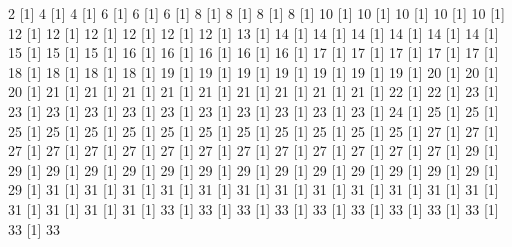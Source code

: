 \documentclass[12pt]{article}
\begin{document}
\begin{Schunk}
\begin{Soutput}
[1] 2%
[1] 4%
[1] 4%
[1] 6%
[1] 6%
[1] 6%
[1] 8%
[1] 8%
[1] 8%
[1] 8%
[1] 10%
[1] 10%
[1] 10%
[1] 10%
[1] 10%
[1] 12%
[1] 12%
[1] 12%
[1] 12%
[1] 12%
[1] 12%
[1] 13%
[1] 14%
[1] 14%
[1] 14%
[1] 14%
[1] 14%
[1] 14%
[1] 15%
[1] 15%
[1] 15%
[1] 16%
[1] 16%
[1] 16%
[1] 16%
[1] 16%
[1] 17%
[1] 17%
[1] 17%
[1] 17%
[1] 17%
[1] 18%
[1] 18%
[1] 18%
[1] 18%
[1] 19%
[1] 19%
[1] 19%
[1] 19%
[1] 19%
[1] 19%
[1] 19%
[1] 20%
[1] 20%
[1] 20%
[1] 21%
[1] 21%
[1] 21%
[1] 21%
[1] 21%
[1] 21%
[1] 21%
[1] 21%
[1] 21%
[1] 22%
[1] 22%
[1] 23%
[1] 23%
[1] 23%
[1] 23%
[1] 23%
[1] 23%
[1] 23%
[1] 23%
[1] 23%
[1] 23%
[1] 23%
[1] 24%
[1] 25%
[1] 25%
[1] 25%
[1] 25%
[1] 25%
[1] 25%
[1] 25%
[1] 25%
[1] 25%
[1] 25%
[1] 25%
[1] 25%
[1] 25%
[1] 27%
[1] 27%
[1] 27%
[1] 27%
[1] 27%
[1] 27%
[1] 27%
[1] 27%
[1] 27%
[1] 27%
[1] 27%
[1] 27%
[1] 27%
[1] 27%
[1] 29%
[1] 29%
[1] 29%
[1] 29%
[1] 29%
[1] 29%
[1] 29%
[1] 29%
[1] 29%
[1] 29%
[1] 29%
[1] 29%
[1] 29%
[1] 29%
[1] 29%
[1] 31%
[1] 31%
[1] 31%
[1] 31%
[1] 31%
[1] 31%
[1] 31%
[1] 31%
[1] 31%
[1] 31%
[1] 31%
[1] 31%
[1] 31%
[1] 31%
[1] 31%
[1] 31%
[1] 33%
[1] 33%
[1] 33%
[1] 33%
[1] 33%
[1] 33%
[1] 33%
[1] 33%
[1] 33%
[1] 33%
[1] 33%

\end{Soutput}
\end{Schunk}
\end{document}
